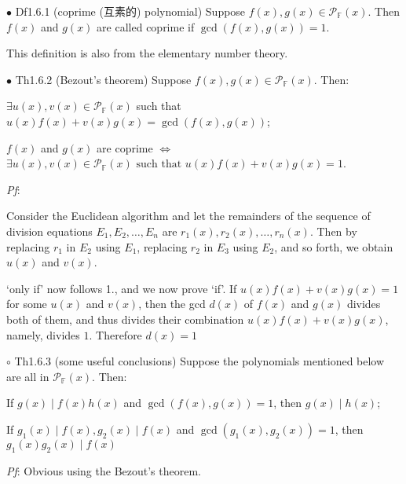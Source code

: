 \documentclass{article}
\begin{document}
\begin{Df}{$\bullet$ Df1.6.1 (coprime (互素的) polynomial)}
    Suppose $f(x), g(x)\in\mathcal{P}_\mathbb{F}(x)$. Then $f(x)$ and $g(x)$ are called coprime if $\gcd(f(x), g(x)) = 1$.
\end{Df}

\begin{Rmk}{}
    This definition is also from the elementary number theory.
\end{Rmk}

\begin{Th}{$\bullet$ Th1.6.2 (Bezout's theorem)}
    Suppose $f(x), g(x)\in\mathcal{P}_\mathbb{F}(x)$. Then:
    \begin{compactenum}
        \item $\exists u(x), v(x)\in \mathcal{P}_\mathbb{F}(x)$ such that $u(x)f(x)+v(x)g(x) = \gcd(f(x), g(x))$;
        \item $f(x)$ and $g(x)$ are coprime $\Leftrightarrow $ $\exists u(x), v(x)\in \mathcal{P}_\mathbb{F}(x) \text{ such that } u(x)f(x)+v(x)g(x) = 1$.
    \end{compactenum}
    \tcblower
    \textit{Pf}: \begin{compactenum}
        \item Consider the Euclidean algorithm and let the remainders of the sequence of division equations $E_1, E_2, \dots, E_n$ are $r_1(x), r_2(x), \dots, r_n(x)$. Then by replacing $r_1$ in $E_2$ using $E_1$, replacing $r_2$ in $E_3$ using $E_2$, and so forth, we obtain $u(x)$ and $v(x)$.
        \item `only if' now follows 1., and we now prove `if'. If $u(x)f(x)+v(x)g(x) = 1$ for some $u(x)$ and $v(x)$, then the gcd $d(x)$ of $f(x)$ and $g(x)$ divides both of them, and thus divides their combination $u(x)f(x)+v(x)g(x)$, namely, divides $1$. Therefore $d(x) = 1$
    \end{compactenum}
\end{Th}

\begin{Th}{$\circ$ Th1.6.3 (some useful conclusions)}
    Suppose the polynomials mentioned below are all in $\mathcal{P}_\mathbb{F}(x)$. Then:
    \begin{compactenum}
        \item If $g(x)\mid f(x)h(x)$ and $\gcd(f(x), g(x)) = 1$, then $g(x)\mid h(x)$;
        \item If $g_1(x)\mid f(x), g_2(x)\mid f(x)$ and $\gcd(g_1(x), g_2(x)) = 1$, then $g_1(x)g_2(x)\mid f(x)$
    \end{compactenum}
    \tcblower
    \textit{Pf}: Obvious using the Bezout's theorem.
\end{Th}
\end{document}
